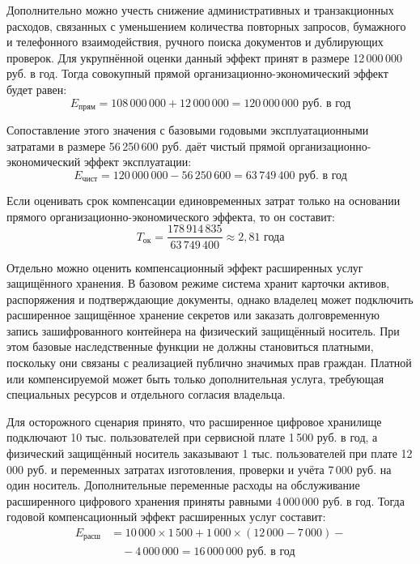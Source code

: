 Дополнительно можно учесть снижение административных и транзакционных расходов, связанных с уменьшением количества повторных запросов, бумажного и телефонного взаимодействия, ручного поиска документов и дублирующих проверок. Для укрупнённой оценки данный эффект принят в размере 12\,000\,000 руб. в год. Тогда совокупный прямой организационно-экономический эффект будет равен:
\begin{equation}
E_{\text{прям}} = 108\,000\,000 + 12\,000\,000 = 120\,000\,000 \text{ руб. в год}
\label{eq:direct-effect}
\end{equation}

Сопоставление этого значения с базовыми годовыми эксплуатационными затратами в размере 56\,250\,600 руб. даёт чистый прямой организационно-экономический эффект эксплуатации:
\begin{equation}
E_{\text{чист}} = 120\,000\,000 - 56\,250\,600 = 63\,749\,400 \text{ руб. в год}
\label{eq:net-direct-effect}
\end{equation}

Если оценивать срок компенсации единовременных затрат только на основании прямого организационно-экономического эффекта, то он составит:
\begin{equation}
T_{\text{ок}} = \frac{178\,914\,835}{63\,749\,400} \approx 2{,}81 \text{ года}
\label{eq:payback-direct}
\end{equation}

Отдельно можно оценить компенсационный эффект расширенных услуг защищённого хранения. В базовом режиме система хранит карточки активов, распоряжения и подтверждающие документы, однако владелец может подключить расширенное защищённое хранение секретов или заказать долговременную запись зашифрованного контейнера на физический защищённый носитель. При этом базовые наследственные функции не должны становиться платными, поскольку они связаны с реализацией публично значимых прав граждан. Платной или компенсируемой может быть только дополнительная услуга, требующая специальных ресурсов и отдельного согласия владельца.

Для осторожного сценария принято, что расширенное цифровое хранилище подключают 10 тыс. пользователей при сервисной плате 1\,500 руб. в год, а физический защищённый носитель заказывают 1 тыс. пользователей при плате 12\,000 руб. и переменных затратах изготовления, проверки и учёта 7\,000 руб. на один носитель. Дополнительные переменные расходы на обслуживание расширенного цифрового хранения приняты равными 4\,000\,000 руб. в год. Тогда годовой компенсационный эффект расширенных услуг составит:
\begin{equation}
\begin{split}
E_{\text{расш}} &=
10\,000 \times 1\,500 +
1\,000 \times (12\,000 - 7\,000) - \\
&\quad - 4\,000\,000 =
16\,000\,000 \text{ руб. в год}
\end{split}
\label{eq:extended-storage-effect}
\end{equation}

